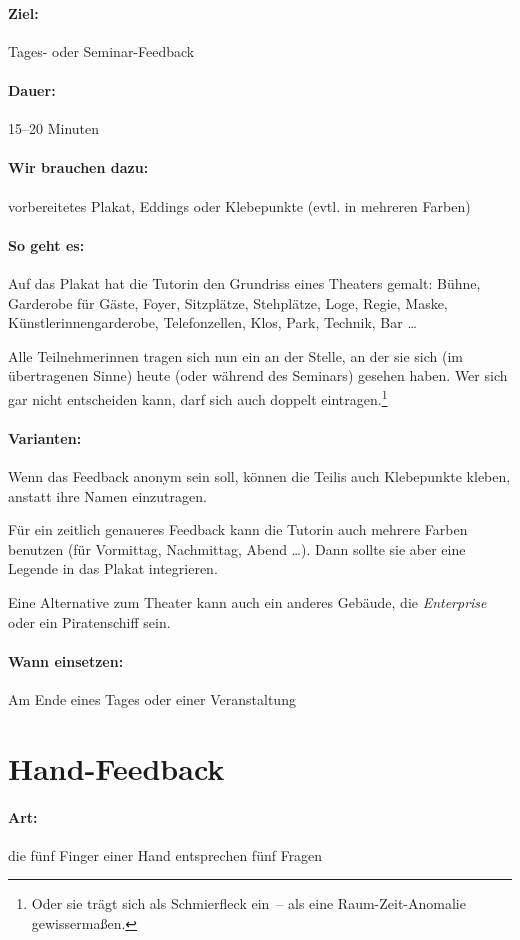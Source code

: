\paragraph{Ziel:} Tages- oder Seminar-Feedback
\paragraph{Dauer:} 15--20 Minuten
\paragraph{Wir brauchen dazu:} vorbereitetes Plakat, Eddings oder Klebepunkte (evtl. in mehreren Farben)
\paragraph{So geht es:} Auf das Plakat hat die Tutorin den Grundriss eines Theaters gemalt: Bühne, Garderobe für Gäste, Foyer, Sitzplätze, Stehplätze, Loge, Regie, Maske, Künstlerinnengarderobe, Telefonzellen, Klos, Park, Technik, Bar \ldots

Alle Teilnehmerinnen tragen sich nun ein an der Stelle, an der sie sich (im übertragenen Sinne) heute (oder während des Seminars) gesehen haben. Wer sich gar nicht entscheiden kann, darf sich auch doppelt eintragen.\footnote{Oder sie trägt sich als Schmierfleck ein~-- als eine Raum-Zeit-Anomalie gewissermaßen.}
\paragraph{Varianten:} Wenn das Feedback anonym sein soll, können die Teilis auch Klebepunkte kleben, anstatt ihre Namen einzutragen.

Für ein zeitlich genaueres Feedback kann die Tutorin auch mehrere Farben benutzen (für Vormittag, Nachmittag, Abend \ldots). Dann sollte sie aber eine Legende in das Plakat integrieren.

Eine Alternative zum Theater kann auch ein anderes Gebäude, die \emph{Enterprise} oder ein Piratenschiff sein.
\paragraph{Wann einsetzen:} Am Ende eines Tages oder einer Veranstaltung

\section{Hand-Feedback}
\paragraph{Art:} die fünf Finger einer Hand entsprechen fünf Fragen
